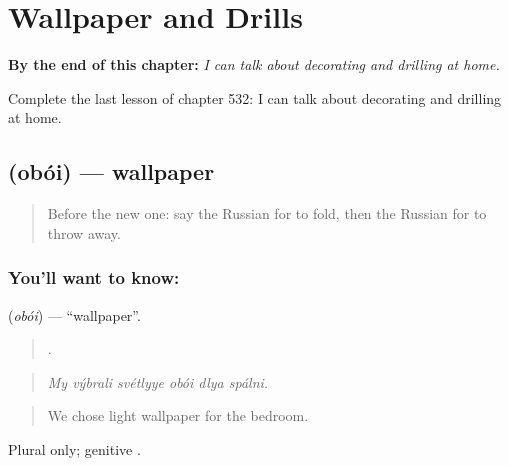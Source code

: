 
\chapter{Wallpaper and Drills}
\label{ch:ru-wallpaper-and-drills}

\begin{chapteropening}
\textbf{By the end of this chapter:} \emph{I can talk about decorating and drilling at home.}

Complete the last lesson of chapter 532: I can talk about decorating and drilling at home.
\end{chapteropening}

\section[\texorpdfstring{\ru{обои} (obói)}{обои (obói)}]{ (obói) — wallpaper}

\label{lesson:RU-C532-oboi}



\begin{quote}
Before the new one: say the Russian for to fold, then the Russian for to throw away.
\end{quote}

\subsection*{You'll want to know: }
\textbf{} (\emph{obói}) — \textquotedblleft{}wallpaper\textquotedblright{}.

\begin{quote}
     .
\end{quote}

\begin{quote}
\emph{My výbrali svétlyye obói dlya spálni.}
\end{quote}

\begin{quote}
We chose light wallpaper for the bedroom.
\end{quote}

Plural only; genitive .

